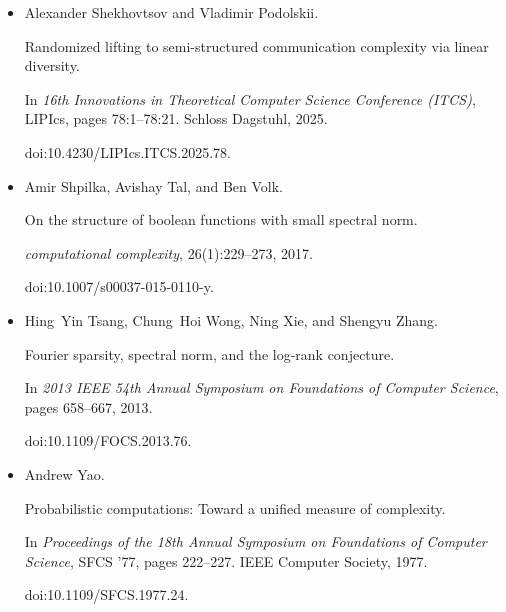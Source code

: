 \documentclass[10pt,a4paper]{article}
\begin{document}
\begin{itemize}
Towards proving strong direct product theorems.


\emph{computational complexity}, 12(1):1–22, 2003.


doi:10.1007/s00037-003-0175-x.





\item[] 
[52]

Alexander Shekhovtsov and Vladimir Podolskii.


Randomized lifting to semi-structured communication complexity via
linear diversity.


In \emph{16th Innovations in Theoretical Computer Science Conference
(ITCS)}, LIPIcs, pages 78:1–78:21. Schloss Dagstuhl, 2025.


doi:10.4230/LIPIcs.ITCS.2025.78.





\item[] 
[53]

Amir Shpilka, Avishay Tal, and Ben Volk.


On the structure of boolean functions with small spectral norm.


\emph{computational complexity}, 26(1):229–273, 2017.


doi:10.1007/s00037-015-0110-y.





\item[] 
[54]

Hing Yin Tsang, Chung Hoi Wong, Ning Xie, and Shengyu Zhang.


Fourier sparsity, spectral norm, and the log-rank conjecture.


In \emph{2013 IEEE 54th Annual Symposium on Foundations of Computer
Science}, pages 658–667, 2013.


doi:10.1109/FOCS.2013.76.





\item[] 
[55]

Andrew Yao.


Probabilistic computations: Toward a unified measure of complexity.


In \emph{Proceedings of the 18th Annual Symposium on Foundations of
Computer Science}, SFCS ’77, pages 222–227. IEEE Computer Society, 1977.


doi:10.1109/SFCS.1977.24.






\end{itemize}
\end{document}
